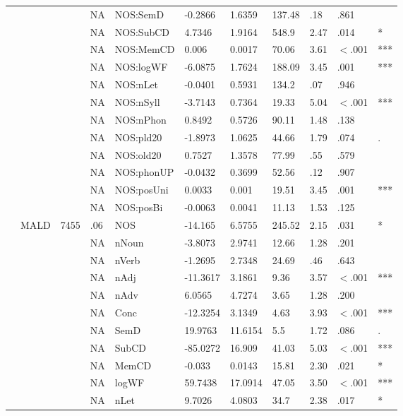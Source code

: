 \begin{table}[ht]
\begin{tabular}{lllllllllll}
   &  &  & NA & NOS:SemD & -0.2866 & 1.6359 & 137.48 & .18 & .861 &   \\ 
   &  &  & NA & NOS:SubCD & 4.7346 & 1.9164 & 548.9 & 2.47 & .014 & * \\ 
   &  &  & NA & NOS:MemCD & 0.006 & 0.0017 & 70.06 & 3.61 & $<$.001 & *** \\ 
   &  &  & NA & NOS:logWF & -6.0875 & 1.7624 & 188.09 & 3.45 & .001 & *** \\ 
   &  &  & NA & NOS:nLet & -0.0401 & 0.5931 & 134.2 & .07 & .946 &   \\ 
   &  &  & NA & NOS:nSyll & -3.7143 & 0.7364 & 19.33 & 5.04 & $<$.001 & *** \\ 
   &  &  & NA & NOS:nPhon & 0.8492 & 0.5726 & 90.11 & 1.48 & .138 &   \\ 
   &  &  & NA & NOS:pld20 & -1.8973 & 1.0625 & 44.66 & 1.79 & .074 & . \\ 
   &  &  & NA & NOS:old20 & 0.7527 & 1.3578 & 77.99 & .55 & .579 &   \\ 
   &  &  & NA & NOS:phonUP & -0.0432 & 0.3699 & 52.56 & .12 & .907 &   \\ 
   &  &  & NA & NOS:posUni & 0.0033 & 0.001 & 19.51 & 3.45 & .001 & *** \\ 
   &  &  & NA & NOS:posBi & -0.0063 & 0.0041 & 11.13 & 1.53 & .125 &   \\ 
   & MALD & 7455 & .06 & NOS & -14.165 & 6.5755 & 245.52 & 2.15 & .031 & * \\ 
   &  &  & NA & nNoun & -3.8073 & 2.9741 & 12.66 & 1.28 & .201 &   \\ 
   &  &  & NA & nVerb & -1.2695 & 2.7348 & 24.69 & .46 & .643 &   \\ 
   &  &  & NA & nAdj & -11.3617 & 3.1861 & 9.36 & 3.57 & $<$.001 & *** \\ 
   &  &  & NA & nAdv & 6.0565 & 4.7274 & 3.65 & 1.28 & .200 &   \\ 
   &  &  & NA & Conc & -12.3254 & 3.1349 & 4.63 & 3.93 & $<$.001 & *** \\ 
   &  &  & NA & SemD & 19.9763 & 11.6154 & 5.5 & 1.72 & .086 & . \\ 
   &  &  & NA & SubCD & -85.0272 & 16.909 & 41.03 & 5.03 & $<$.001 & *** \\ 
   &  &  & NA & MemCD & -0.033 & 0.0143 & 15.81 & 2.30 & .021 & * \\ 
   &  &  & NA & logWF & 59.7438 & 17.0914 & 47.05 & 3.50 & $<$.001 & *** \\ 
   &  &  & NA & nLet & 9.7026 & 4.0803 & 34.7 & 2.38 & .017 & * \\ 

\end{tabular}
\end{table}
